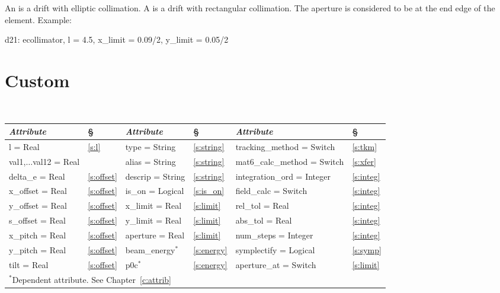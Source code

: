 An  is a drift with elliptic collimation.
A  is a drift with rectangular collimation.
The aperture is considered to be at the end edge of the element.
Example:
\begin{example}
  d21: ecollimator, l = 4.5, x_limit = 0.09/2, y_limit = 0.05/2
\end{example}

\section{Custom}
\label{s:custom}

\begin{center}
\tt
\begin{tabular}{|l|l||l|l||l|l|} \hline
  {\sl Attribute} & \S  & {\sl Attribute} & \S  & {\sl Attribute} & \S \\ \hline
  l        = Real           & \ref{s:l}      & type = String    & \ref{s:string} & tracking\_method = Switch   & \ref{s:tkm}   \\ \hline
  val1,$\ldots$val12 = Real &                & alias = String   & \ref{s:string} & mat6\_calc\_method = Switch & \ref{s:xfer}  \\ \hline
  delta\_e   = Real         & \ref{s:offset} & descrip = String & \ref{s:string} & integration\_ord = Integer  & \ref{s:integ} \\ \hline
  x\_offset  = Real         & \ref{s:offset} & is\_on = Logical & \ref{s:is_on}  & field\_calc = Switch        & \ref{s:integ} \\ \hline
  y\_offset  = Real         & \ref{s:offset} & x\_limit = Real  & \ref{s:limit}  & rel\_tol = Real             & \ref{s:integ} \\ \hline
  s\_offset  = Real         & \ref{s:offset} & y\_limit = Real  & \ref{s:limit}  & abs\_tol = Real             & \ref{s:integ} \\ \hline
  x\_pitch = Real           & \ref{s:offset} & aperture = Real  & \ref{s:limit}  & num\_steps = Integer        & \ref{s:integ} \\ \hline
  y\_pitch = Real           & \ref{s:offset} & beam\_energy$^*$ & \ref{s:energy} & symplectify = Logical       & \ref{s:symp}  \\ \hline
  tilt     = Real           & \ref{s:offset} & p0c$^*$          & \ref{s:energy} & aperture\_at = Switch       & \ref{s:limit} \\ \hline
  \multicolumn{6}{l}{\small $^*$Dependent attribute. See Chapter~\ref{c:attrib}} \\
\end{tabular}
\end{center}
\toffset

